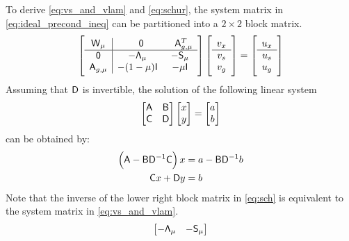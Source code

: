 \begin{remark}
To derive \eqref{eq:vs_and_vlam} and \eqref{eq:schur}, the system matrix in \eqref{eq:ideal_precond_ineq} can be partitioned into a $2 \times 2$ block matrix. 
\begin{equation}\label{eq:sch}
\left[
\begin{array}{c | c c} 
	   \mathsf{W}_\mu   &   \phantom{-}\mathsf{0}  &   \phantom{-}\mathsf{A}_{g,\mu}^T   \\
	   \hline
	   \mathsf{0}    &   -\mathsf{\Lambda}_\mu & -\mathsf{S}_\mu \\
	  \mathsf{A}_{g,\mu}     &  -(1-\mu)\mathsf{I} & -\mu \mathsf{I}   
\end{array}  
\right]
\left[  \begin{array}{c} v_x \\ \hline v_s \\ v_g \end{array} \right]
= 
\left[ \begin{array}{c} u_x \\  \hline u_s \\ u_g \end{array} \right]
\end{equation}
Assuming that $\mathsf{D}$ is invertible, the solution of the following linear system
\begin{equation*}
\begin{bmatrix}
\mathsf{A}  & \mathsf{B} \\
\mathsf{C}  & \mathsf{D} 
\end{bmatrix} 
\begin{bmatrix}
x \\ y
\end{bmatrix}
= 
\begin{bmatrix}
a \\ b
\end{bmatrix}
\end{equation*}
can be obtained by: 
\begin{equation}\label{eq:schx}
\begin{aligned}
\left( \mathsf{A} - \mathsf{B} \mathsf{D}^{-1}\mathsf{C}  \right)x &= a - \mathsf{B} \mathsf{D}^{-1}b \\
\mathsf{C}  x +  \mathsf{D} y &= b 
\end{aligned}
\end{equation}
Note that the inverse of the lower right block matrix in \eqref{eq:sch} is equivalent to the 
system matrix in \eqref{eq:vs_and_vlam}. 
\begin{equation*}
\begin{bmatrix}
 -\mathsf{\Lambda}_\mu & -\mathsf{S}_\mu \\ 

\end{bmatrix}
\end{equation*}
\end{remark}
